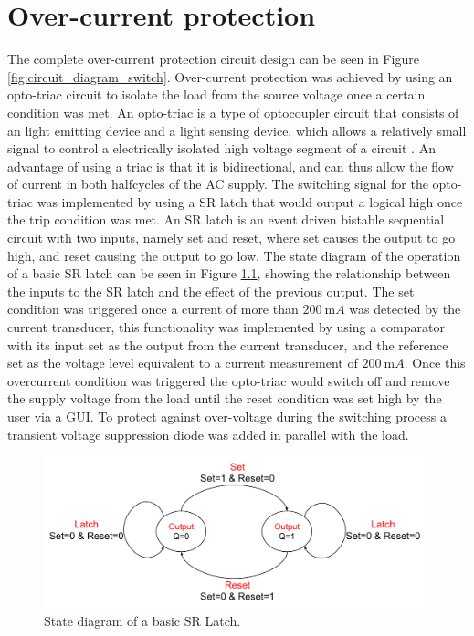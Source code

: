 \chapter{Over-current protection}\label{sec:switch}
The complete over-current protection circuit design can be seen in Figure \ref{fig:circuit_diagram_switch}. Over-current protection was achieved by using an opto-triac circuit to isolate the load from the source voltage once a certain condition was met. An opto-triac is a type of optocoupler circuit that consists of an light emitting device and a light sensing device, which allows a relatively small signal to control a electrically isolated high voltage segment of a circuit \cite{OptoCouplers}. An advantage of using a triac is that it is bidirectional, and can thus allow the flow of current in both halfcycles of the AC supply.\vspace{4mm} \newline  The switching signal for the opto-triac was implemented by using a SR latch that would output a logical high once the trip condition was met. An SR latch is an event driven bistable sequential circuit with two inputs, namely set and reset, where set causes the output to go high, and reset causing the output to go low. The state diagram of the operation of a basic SR latch can be seen in Figure \ref{fig:state_diagram_switch}, showing the relationship between the inputs to the SR latch and the effect of the previous output. The set condition was triggered once a current of more than $\SI{200}{\milli A}$ was detected by the current transducer, this functionality was implemented by using a comparator with its input set as the output from the current transducer, and the reference set as the voltage level equivalent to a current measurement of $\SI{200}{\milli A}$. Once this overcurrent condition was triggered the opto-triac would switch off and remove the supply voltage from the load until the reset condition was set high by the user via a GUI. To protect against over-voltage during the switching process a transient voltage suppression diode was added in parallel with the load.
\begin{figure}[!ht]
  \centering
 \footnotesize
        \includegraphics[width=0.65\linewidth]{./Figures/state_diagram_switch.pdf}
    		    \caption{State diagram of a basic SR Latch.} \label{fig:state_diagram_switch}
 \end{figure}

